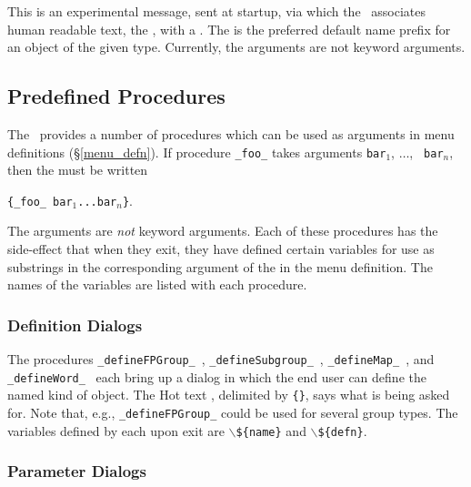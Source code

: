 
This is an experimental message, sent at startup, via which the \SM\
associates human readable text, the , with a .
The \marg{prefix} is the preferred default name prefix for an object
of the given type. Currently, the arguments are not keyword arguments.


\subsection{Predefined Procedures}\label{predefined_procedures}

The \FE\ provides a number of procedures which can be used as
 arguments in menu definitions (\S\ref{menu_defn}). If
procedure {\tt\_foo\_} takes arguments {\tt bar$_1$}, $\ldots$, {\tt
bar$_n$}, then the \marg{action} must be written

{\tt\{\_foo\_ bar$_1$...bar$_n$\}}.

The arguments are {\em not} keyword arguments. Each of these
procedures has the side-effect that when they exit, they have defined
certain variables for use as substrings in the corresponding
 argument of the  in the menu
definition. The names of the variables are listed with each procedure.

\subsubsection{Definition Dialogs}

The procedures {\tt\_defineFPGroup\_}~,
{\tt\_defineSubgroup\_}~, {\tt\_defineMap\_}~\marg{title},
and {\tt\_defineWord\_}~ each bring up a dialog in which
the end user can define the named kind of object. The {\sf Hot} text
\marg{title}, delimited by {\tt\{\}}, says what is being asked
for. Note that, e.g., {\tt\_defineFPGroup\_} could be used for several
group types. The variables defined by each upon exit are
$\backslash${\tt\$\{name\}} and $\backslash${\tt\$\{defn\}}.


\subsubsection{Parameter Dialogs}

